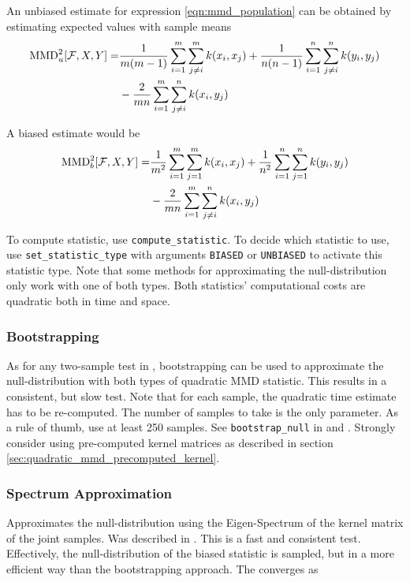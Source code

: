 An unbiased estimate for expression \ref{eqn:mmd_population} can be obtained by estimating expected values with sample means
\begin{align*}
\operatorname{MMD}_u^2[\mathcal{F},X,Y]=&\frac{1}{m(m-1)}\sum_{i=1}^m\sum_{j\neq i}^mk(x_i,x_j) + \frac{1}{n(n-1)}\sum_{i=1}^n\sum_{j\neq i}^nk(y_i,y_j)\\
&-\frac{2}{mn}\sum_{i=1}^m\sum_{j\neq i}^nk(x_i,y_j)
\end{align*}

A biased estimate would be
\begin{align*}
\operatorname{MMD}_b^2[\mathcal{F},X,Y]=&\frac{1}{m^2}\sum_{i=1}^m\sum_{j=1}^mk(x_i,x_j) + \frac{1}{n^ 2}\sum_{i=1}^n\sum_{j=1}^nk(y_i,y_j)\\
&-\frac{2}{mn}\sum_{i=1}^m\sum_{j\neq i}^nk(x_i,y_j)
\end{align*}

To compute statistic, use \texttt{compute\_statistic}. To decide which statistic to use, use \texttt{set\_statistic\_type} with arguments \texttt{BIASED} or \texttt{UNBIASED} to activate this statistic type. Note that some methods for approximating the null-distribution only work with one of both types. Both statistics' computational costs are quadratic both in time and space.

\subsubsection{Bootstrapping}
As for any two-sample test in \shogun{}, bootstrapping can be used to approximate the null-distribution with both types of quadratic MMD statistic. This results in a consistent, but slow test. Note that for each sample, the quadratic time estimate has to be re-computed. The number of samples to take is the only parameter. As a rule of thumb, use at least 250 samples.
See \texttt{bootstrap\_null} in  and . Strongly consider using pre-computed kernel matrices as described in section \ref{sec:quadratic_mmd_precomputed_kernel}.

\subsubsection{Spectrum Approximation}
Approximates the null-distribution using the Eigen-Spectrum of the kernel matrix of the joint samples. Was described in \citep{Gretton2012b}. This is a fast and consistent test. Effectively, the null-distribution of the biased statistic is sampled, but in a more efficient way than the bootstrapping approach. The converges as

